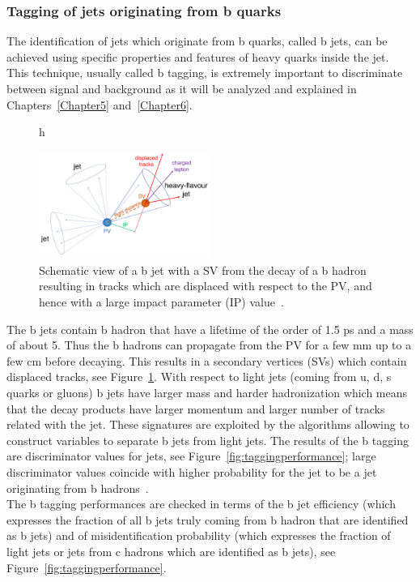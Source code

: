 \subsubsection{Tagging of jets originating from b
  quarks}\label{sec:tagging}
The identification of jets which originate from b quarks, called
b jets, can be achieved using
specific properties and features of heavy
quarks inside the jet. This technique, usually called b tagging, is
extremely important to discriminate between signal and background as
it will be analyzed and explained in Chapters~\ref{Chapter5}
and~\ref{Chapter6}.
\begin{figure}{h}
  \begin{center}
    \includegraphics[clip,trim=0.3cm 0.5cm 0.3cm 0.3cm, width=0.50\textwidth]{Figures/c2/tagging}
  \end{center}
  \caption{Schematic view of a b jet with a SV from the decay of a b hadron resulting in tracks which are displaced with respect to the PV, and hence with a large impact parameter (IP) value~\cite{Sirunyan_2018_tagging}.}
\label{fig:btagging}
\end{figure}

The b jets contain b hadron that have a lifetime of the order of 1.5
ps and a mass of about
5\GeV. Thus the b hadrons can propagate from
the PV for a few mm up to a few cm before decaying. This results in
a secondary vertices (SVs) which contain displaced tracks, see
Figure~\ref{fig:btagging}. With respect to light jets (coming from
u, d, s quarks or gluons) b jets have larger mass and harder hadronization which
means that the decay products have larger momentum and larger number
of tracks related with the jet. These signatures are exploited by the
algorithms allowing to construct variables to separate b jets from
light jets. The results of the b tagging are discriminator values for
jets, see Figure~\ref{fig:taggingperformance}; large discriminator values coincide with higher probability for
the jet to be a jet originating from b hadrons~\cite{CMS-DP-2017-013,
  csv}.\\
The b tagging performances are checked in terms of the b jet
efficiency (which expresses the fraction of all b jets truly coming from b hadron
that are identified as b jets) and of misidentification probability
(which expresses the fraction of light jets or jets from c hadrons
which are identified as b jets), see
Figure~\ref{fig:taggingperformance}. 


